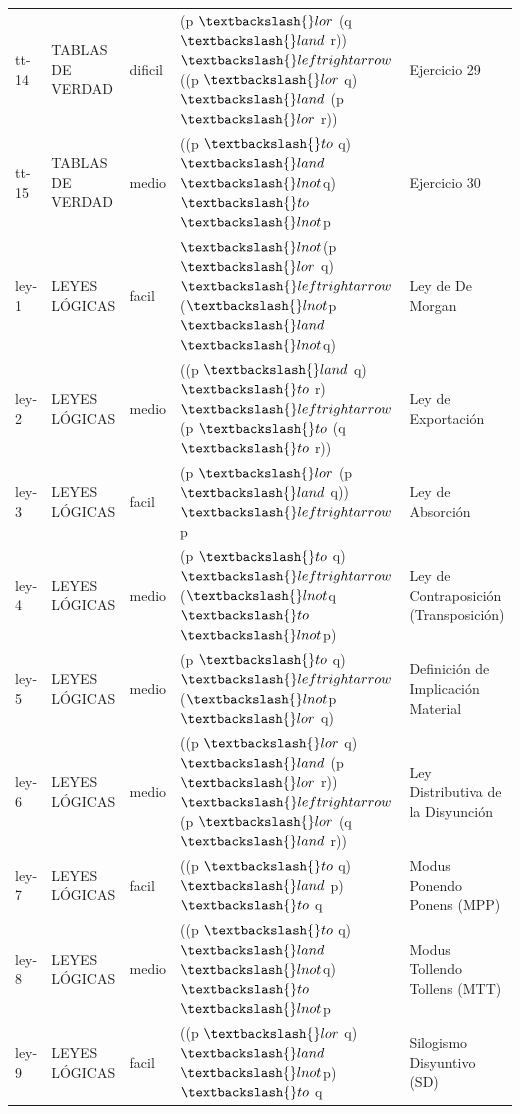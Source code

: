 \documentclass[11pt,a4paper,openany]{book}
\begin{document}
\begin{center}
\begin{longtable}{lllll}
tt-14 & TABLAS DE VERDAD & dificil & (p $ \textbackslash\{\}lor $ (q $ \textbackslash\{\}land $ r)) $ \textbackslash\{\}leftrightarrow $ ((p $ \textbackslash\{\}lor $ q) $ \textbackslash\{\}land $ (p $ \textbackslash\{\}lor $ r)) & Ejercicio 29 \\
tt-15 & TABLAS DE VERDAD & medio & ((p $ \textbackslash\{\}to $ q) $ \textbackslash\{\}land $ $ \textbackslash\{\}lnot $q) $ \textbackslash\{\}to $ $ \textbackslash\{\}lnot $p & Ejercicio 30 \\
ley-1 & LEYES LÓGICAS & facil & $ \textbackslash\{\}lnot $(p $ \textbackslash\{\}lor $ q) $ \textbackslash\{\}leftrightarrow $ ($ \textbackslash\{\}lnot $p $ \textbackslash\{\}land $ $ \textbackslash\{\}lnot $q) & Ley de De Morgan \\
ley-2 & LEYES LÓGICAS & medio & ((p $ \textbackslash\{\}land $ q) $ \textbackslash\{\}to $ r) $ \textbackslash\{\}leftrightarrow $ (p $ \textbackslash\{\}to $ (q $ \textbackslash\{\}to $ r)) & Ley de Exportación \\
ley-3 & LEYES LÓGICAS & facil & (p $ \textbackslash\{\}lor $ (p $ \textbackslash\{\}land $ q)) $ \textbackslash\{\}leftrightarrow $ p & Ley de Absorción \\
ley-4 & LEYES LÓGICAS & medio & (p $ \textbackslash\{\}to $ q) $ \textbackslash\{\}leftrightarrow $ ($ \textbackslash\{\}lnot $q $ \textbackslash\{\}to $ $ \textbackslash\{\}lnot $p) & Ley de Contraposición (Transposición) \\
ley-5 & LEYES LÓGICAS & medio & (p $ \textbackslash\{\}to $ q) $ \textbackslash\{\}leftrightarrow $ ($ \textbackslash\{\}lnot $p $ \textbackslash\{\}lor $ q) & Definición de Implicación Material \\
ley-6 & LEYES LÓGICAS & medio & ((p $ \textbackslash\{\}lor $ q) $ \textbackslash\{\}land $ (p $ \textbackslash\{\}lor $ r)) $ \textbackslash\{\}leftrightarrow $ (p $ \textbackslash\{\}lor $ (q $ \textbackslash\{\}land $ r)) & Ley Distributiva de la Disyunción \\
ley-7 & LEYES LÓGICAS & facil & ((p $ \textbackslash\{\}to $ q) $ \textbackslash\{\}land $ p) $ \textbackslash\{\}to $ q & Modus Ponendo Ponens (MPP) \\
ley-8 & LEYES LÓGICAS & medio & ((p $ \textbackslash\{\}to $ q) $ \textbackslash\{\}land $ $ \textbackslash\{\}lnot $q) $ \textbackslash\{\}to $ $ \textbackslash\{\}lnot $p & Modus Tollendo Tollens (MTT) \\
ley-9 & LEYES LÓGICAS & facil & ((p $ \textbackslash\{\}lor $ q) $ \textbackslash\{\}land $ $ \textbackslash\{\}lnot $p) $ \textbackslash\{\}to $ q & Silogismo Disyuntivo (SD) \\

\end{longtable}
\end{center}
\end{document}
